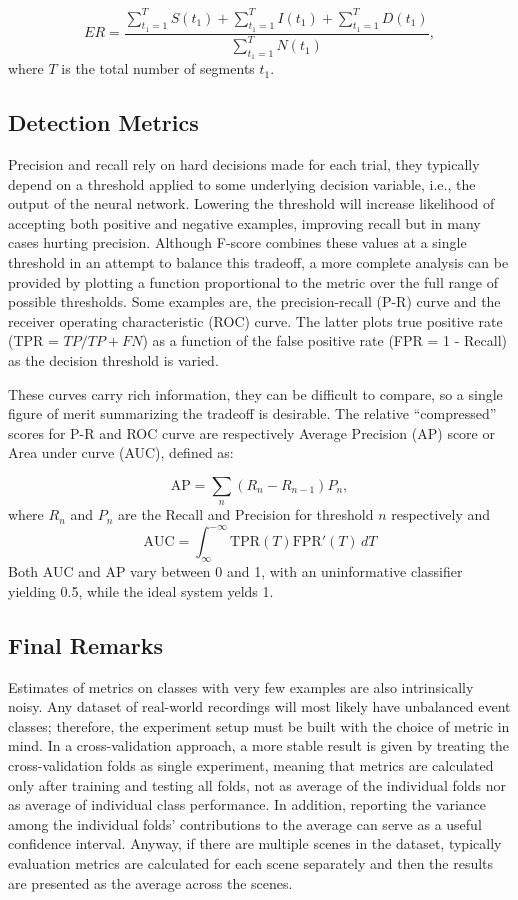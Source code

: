 \begin{equation}
ER = \frac{\sum_{t_1=1}^{T} S(t_1) + \sum_{t_1=1}^{T} I(t_1) + \sum_{t_1=1}^{T} D(t_1)}{\sum_{t_1=1}^{T} N(t_1)},
\end{equation}
where $T$ is the total number of segments $t_1$.


\subsection{Detection Metrics}
Precision and recall rely on hard decisions made for each trial, they typically depend on a threshold applied to some underlying decision variable, i.e., the output of the neural network. 
Lowering the threshold will increase likelihood of accepting both positive and negative examples, improving recall but in many cases hurting precision. Although F-score combines these values at a single threshold in an attempt to balance this
tradeoff, a more complete analysis can be provided by plotting a function proportional to the metric over the full range of possible thresholds. Some examples are, the precision-recall (P-R) curve and the receiver operating characteristic (ROC) curve. The latter plots true positive rate (TPR = $TP/TP+FN$) as a function of the false
positive rate (FPR = 1 - Recall) as the decision threshold is
varied. 

These curves carry rich information, they can be difficult to compare, so a
 single figure of merit summarizing the tradeoff is desirable. The
relative ``compressed'' scores for P-R and ROC curve are respectively Average Precision (AP) score
or Area under curve (AUC), defined as:

\begin{equation}
\text{AP} = \sum_n (R_n-R_{n-1})P_n,
\end{equation}
where $R_n$ and $P_n$ are the Recall and Precision for threshold $n$ respectively and
\begin{equation}
\text{AUC}=\int _{\infty }^{-\infty }{\mbox{TPR}}(T){\mbox{FPR}}'(T)\,dT
\end{equation}
Both AUC and AP vary between 0 and 1, with an uninformative classifier yielding 0.5, while the ideal system yelds 1.


\subsection{Final Remarks}
Estimates of metrics on classes with very few examples are also intrinsically noisy. Any dataset of real-world
recordings will most likely have unbalanced event classes; therefore, the experiment setup must be built with the choice of metric in mind. In a cross-validation approach, a more stable result is given by treating the cross-validation folds as single experiment, meaning that metrics are calculated only after training and testing all folds, not as average of the individual folds nor as average of individual class performance. In addition, reporting the variance among the individual folds’ contributions to the average
can serve as a useful confidence interval.
Anyway, if there are multiple scenes in the dataset, typically evaluation metrics are calculated for each scene separately and then the results are presented as the average across the scenes.


